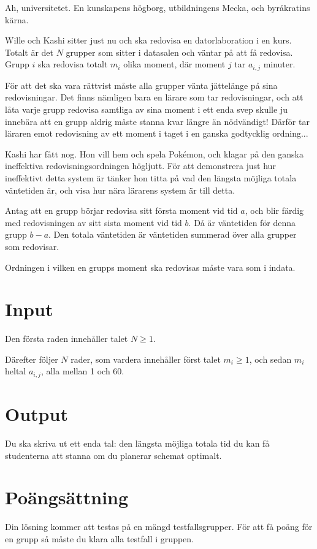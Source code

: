 Ah, universitetet. En kunskapens högborg, utbildningens Mecka, och byråkratins kärna.

Wille och Kashi sitter just nu och ska redovisa en datorlaboration i en kurs. Totalt
är det $N$ grupper som sitter i datasalen och väntar på att få redovisa. Grupp $i$
ska redovisa totalt $m_i$ olika moment, där moment $j$ tar $a_{i, j}$ minuter.

För att det ska vara rättvist måste alla grupper vänta jättelänge på sina redovisningar.
Det finns nämligen bara en lärare som tar redovisningar, och att låta varje grupp
redovisa samtliga av sina moment i ett enda svep skulle ju innebära
att en grupp aldrig måste stanna kvar längre än nödvändigt! Därför tar läraren
emot redovisning av ett moment i taget i en ganska godtycklig ordning...

Kashi har fått nog. Hon vill hem och spela Pokémon, och klagar på den ganska
ineffektiva redovisningsordningen högljutt. För att demonstrera just hur ineffektivt
detta system är tänker hon titta på vad den längsta möjliga totala väntetiden är,
och visa hur nära lärarens system är till detta.

Antag att en grupp börjar redovisa sitt första moment vid tid $a$, och
blir färdig med redovisningen av sitt sista moment vid tid $b$. Då är väntetiden
för denna grupp $b - a$. Den totala väntetiden är väntetiden summerad över alla
grupper som redovisar.

Ordningen i vilken en grupps moment ska redovisas måste vara som i indata.

\section*{Input}
Den första raden innehåller talet $N \ge 1$.

Därefter följer $N$ rader, som vardera innehåller först talet $m_i \ge 1$, och sedan $m_i$ heltal $a_{i,j}$, alla mellan 1 och 60.


\section*{Output}
Du ska skriva ut ett enda tal: den längsta möjliga totala tid du kan få studenterna att stanna om du planerar schemat optimalt.

\section*{Poängsättning}
Din lösning kommer att testas på en mängd testfallsgrupper. För att få poäng för en grupp så måste du klara alla testfall i gruppen.


